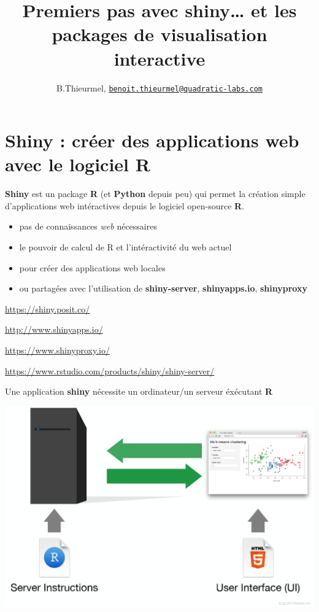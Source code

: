 \documentclass[
]{article}
\title{Premiers pas avec shiny\ldots{} et les packages de visualisation
interactive}
\author{B.Thieurmel,
\href{mailto:benoit.thieurmel@quadratic-labs.com}{\nolinkurl{benoit.thieurmel@quadratic-labs.com}}}
\date{}
\providecommand{\tightlist}{%
  \setlength{\itemsep}{0pt}\setlength{\parskip}{0pt}}
\begin{document}
\maketitle

{
\setcounter{tocdepth}{2}
\tableofcontents
}
\hypertarget{shiny-cruxe9er-des-applications-web-avec-le-logiciel-r}{%
\section{Shiny : créer des applications web avec le logiciel
R}\label{shiny-cruxe9er-des-applications-web-avec-le-logiciel-r}}

\textbf{Shiny} est un package \textbf{R} (et \textbf{Python} depuis peu)
qui permet la création simple d'applications web intéractives depuis le
logiciel open-source \textbf{R}.

\begin{itemize}
\tightlist
\item
  pas de connaissances \emph{web} nécessaires
\item
  le pouvoir de calcul de R et l'intéractivité du web actuel
\item
  pour créer des applications web locales
\item
  ou partagées avec l'utilisation de \textbf{shiny-server},
  \textbf{shinyapps.io}, \textbf{shinyproxy}
\end{itemize}

\url{https://shiny.posit.co/}

\url{http://www.shinyapps.io/}

\url{https://www.shinyproxy.io/}

\url{https://www.rstudio.com/products/shiny/shiny-server/}

Une application \textbf{shiny} nécessite un ordinateur/un serveur
éxécutant \textbf{R}

\includegraphics{img/server_R.png}
\end{document}
